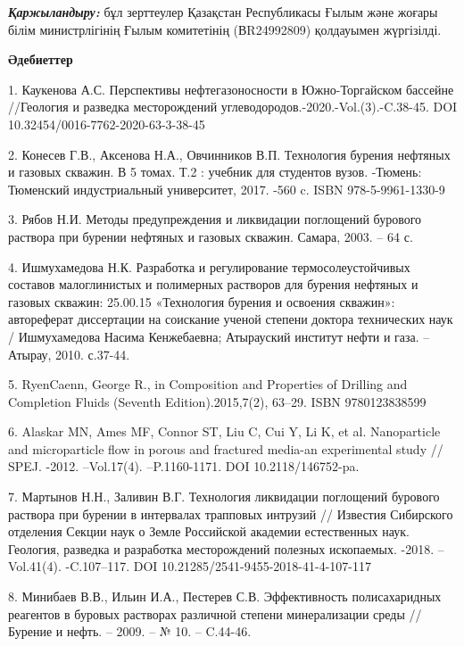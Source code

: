 \begin{multicols}{2}
\emph{{\bfseries Қаржыландыру:}} бұл зерттеулер Қазақстан Республикасы
Ғылым және жоғары білім министрлігінің Ғылым комитетінің (ВR24992809)
қолдауымен жүргізілді.
\end{multicols}

\begin{center}
{\bfseries Әдебиеттер}
\end{center}

\begin{references}
1. Каукенова А.С. Перспективы нефтегазоносности в Южно-Торгайском
бассейне //Геология и разведка месторождений
углеводородов.-2020.-Vol.(3).-C.38-45. DOI
10.32454/0016-7762-2020-63-3-38-45

2. Конесев Г.В., Аксенова Н.А., Овчинников В.П. Технология бурения
нефтяных и газовых скважин. В 5 томах. Т.2 : учебник для студентов
вузов. -Тюмень: Тюменский индустриальный университет, 2017. -560 c. ISBN
978-5-9961-1330-9

3. Рябов Н.И. Методы предупреждения и ликвидации поглощений бурового
раствора при бурении нефтяных и газовых скважин. Самара, 2003. -- 64 с.

4. Ишмухамедова Н.К. Разработка и регулирование термосолеустойчивых
составов малоглинистых и полимерных растворов для бурения нефтяных и
газовых скважин: 25.00.15 «Технология бурения и освоения скважин»:
автореферат диссертации на соискание ученой степени доктора технических
наук / Ишмухамедова Насима Кенжебаевна; Атырауский институт нефти и
газа. -- Атырау, 2010. с.37-44.

5. RyenCaenn, George R., in Composition and Properties of Drilling and
Completion Fluids (Seventh Edition).2015,7(2), 63--29. ISBN
9780123838599

6. Alaskar MN, Ames MF, Connor ST, Liu C, Cui Y, Li K, et al.
Nanoparticle and microparticle flow in porous and fractured media-an
experimental study // SPEJ. -2012. --Vol.17(4). --P.1160-1171. DOI
10.2118/146752-pa.

7. Мартынов Н.Н., Заливин В.Г. Технология ликвидации поглощений бурового
раствора при бурении в интервалах трапповых интрузий // Известия
Сибирского отделения Секции наук о Земле Российской академии
естественных наук. Геология, разведка и разработка месторождений
полезных ископаемых. -2018. --Vol.41(4). -C.107--117. DOI
10.21285/2541-9455-2018-41-4-107-117

8. Минибаев В.В., Ильин И.А., Пестерев С.В. Эффективность полисахаридных
реагентов в буровых растворах различной степени минерализации среды //
Бурение и нефть. -- 2009. -- № 10. -- C.44-46.


\end{references}
